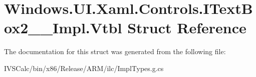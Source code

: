 \hypertarget{struct_windows_1_1_u_i_1_1_xaml_1_1_controls_1_1_i_text_box2_____impl_1_1_vtbl}{}\section{Windows.\+U\+I.\+Xaml.\+Controls.\+I\+Text\+Box2\+\_\+\+\_\+\+Impl.\+Vtbl Struct Reference}
\label{struct_windows_1_1_u_i_1_1_xaml_1_1_controls_1_1_i_text_box2_____impl_1_1_vtbl}


The documentation for this struct was generated from the following file\+:\begin{DoxyCompactItemize}
\item 
I\+V\+S\+Calc/bin/x86/\+Release/\+A\+R\+M/ilc/Impl\+Types.\+g.\+cs\end{DoxyCompactItemize}
